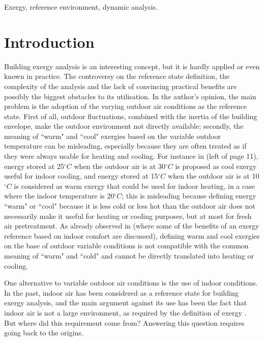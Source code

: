 \documentclass[10pt]{extarticle} %
\begin{document}
{\sffamily\normalsize Exergy, reference environment, dynamic analysis.}


\section{Introduction} 

\sffamily\normalsize

Building exergy analysis is an interesting concept, but it is hardly applied or even known in practice. The controversy on the reference state definition, the complexity of the analysis and the lack of convincing practical benefits are possibly the biggest obstacles to its utilisation. In the author's opinion, the main problem is the adoption of the varying outdoor air conditions as the reference state. First of all, outdoor fluctuations, combined with the inertia of the building envelope, make the outdoor environment not directly available; secondly, the meaning of ``warm" and ``cool" exergies based on the variable outdoor temperature can be misleading, especially because they are often treated as if they were always usable for heating and cooling. For instance in \cite{Choi2020} (left of page 11), energy stored at 25$^\circ C$ when the outdoor air is at 30$^\circ C$ is proposed as cool exergy useful for indoor cooling, and energy stored at 15$^\circ C$ when the outdoor air is at 10$^\circ C$ is considered as warm exergy that could be used for indoor heating, in a case where the indoor temperature is 20$^\circ C$; this is misleading because defining energy ``warm" or ``cool" because it is less cold or less hot than the outdoor air does not necessarily make it useful for heating or cooling purposes, but at most for fresh air pretreatment. As already observed in \cite{Bonetti2017a} (where some of the benefits of an exergy reference based on indoor comfort are discussed), defining warm and cool exergies on the base of outdoor variable conditions is not compatible with the common meaning of ``warm" and ``cold" and cannot be directly translated into heating or cooling.

One alternative to variable outdoor air conditions is the use of indoor conditions. In the past, indoor air has been considered as a reference state for building exergy analysis, and the main argument against its use has been the fact that indoor air is not a large environment, as required by the definition of exergy \citep{Schmidt2011}. But where did this requirement come from? Answering this question requires going back to the origins.
\end{document}
